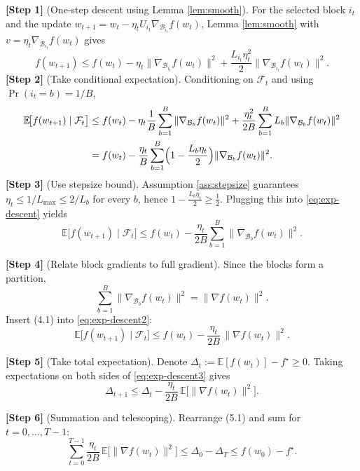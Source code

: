 \documentclass[11pt]{article}
\newcommand{\E}{\mathbb{E}}
\newcommand{\block}[1]{\mathcal{B}_{#1}}
\begin{document}
\bigskip
\noindent\textbf{[Step 1]} (One‑step descent using Lemma \ref{lem:smooth}).  
For the selected block $i_t$ and the update $w_{t+1}=w_t-\eta_tU_{i_t}\nabla_{\block{i_t}}f(w_t)$, Lemma \ref{lem:smooth} with $v=\eta_t\nabla_{\block{i_t}}f(w_t)$ gives
\begin{equation}\label{eq:descent}
f(w_{t+1})\le f(w_t)-\eta_t\|\nabla_{\block{i_t}}f(w_t)\|^{2}
+\frac{L_{i_t}\eta_t^{2}}{2}\|\nabla_{\block{i_t}}f(w_t)\|^{2}.
\end{equation}
\noindent\textbf{[Step 2]} (Take conditional expectation).  
Conditioning on $\mathcal{F}_t$ and using $\Pr(i_t=b)=1/B$,
\begin{align}
\E\!\big[f(w_{t+1})\mid\mathcal{F}_t\big]
&\le f(w_t)-\eta_t\frac{1}{B}\sum_{b=1}^{B}\|\nabla_{\block{b}}f(w_t)\|^{2}
+\frac{\eta_t^{2}}{2B}\sum_{b=1}^{B}L_{b}\|\nabla_{\block{b}}f(w_t)\|^{2}\nonumber\\
&= f(w_t)-\frac{\eta_t}{B}\sum_{b=1}^{B}\Bigl(1-\frac{L_{b}\eta_t}{2}\Bigr)\|\nabla_{\block{b}}f(w_t)\|^{2}.
\label{eq:exp-descent}
\end{align}
\noindent\textbf{[Step 3]} (Use stepsize bound).  
Assumption \ref{ass:stepsize} guarantees $\eta_t\le 1/L_{\max}\le 2/L_{b}$ for every $b$, hence $1-\frac{L_{b}\eta_t}{2}\ge \frac{1}{2}$. Plugging this into \eqref{eq:exp-descent} yields
\begin{equation}\label{eq:exp-descent2}
\E\!\big[f(w_{t+1})\mid\mathcal{F}_t\big]\le
f(w_t)-\frac{\eta_t}{2B}\sum_{b=1}^{B}\|\nabla_{\block{b}}f(w_t)\|^{2}.
\end{equation}

\noindent\textbf{[Step 4]} (Relate block gradients to full gradient).  
Since the blocks form a partition,
\[
\sum_{b=1}^{B}\|\nabla_{\block{b}}f(w_t)\|^{2}= \|\nabla f(w_t)\|^{2}.
\tag{4.1}
\]
Insert (4.1) into \eqref{eq:exp-descent2}:
\begin{equation}\label{eq:exp-descent3}
\E\!\big[f(w_{t+1})\mid\mathcal{F}_t\big]\le
f(w_t)-\frac{\eta_t}{2B}\,\|\nabla f(w_t)\|^{2}.
\end{equation}

\noindent\textbf{[Step 5]} (Take total expectation).  
Denote $\Delta_t:=\E[f(w_t)]-f^{\star}\ge0$. Taking expectations on both sides of \eqref{eq:exp-descent3} gives
\[
\Delta_{t+1}\le \Delta_t-\frac{\eta_t}{2B}\,\E\!\big[\|\nabla f(w_t)\|^{2}\big].
\tag{5.1}
\]

\noindent\textbf{[Step 6]} (Summation and telescoping).  
Rearrange (5.1) and sum for $t=0,\dots,T-1$:
\[
\sum_{t=0}^{T-1}\frac{\eta_t}{2B}\,\E\!\big[\|\nabla f(w_t)\|^{2}\big]
\le \Delta_0-\Delta_T\le f(w_0)-f^{\star}.
\tag{6.1}
\]
\end{document}

